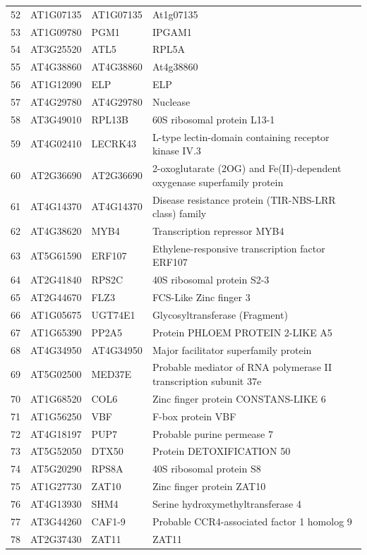 \documentclass[11pt]{article}
\begin{document}
\begin{center}
\begin{tabular}{rlll}
52 & AT1G07135 & AT1G07135 & At1g07135\\
53 & AT1G09780 & PGM1 & IPGAM1\\
54 & AT3G25520 & ATL5 & RPL5A\\
55 & AT4G38860 & AT4G38860 & At4g38860\\
56 & AT1G12090 & ELP & ELP\\
57 & AT4G29780 & AT4G29780 & Nuclease\\
58 & AT3G49010 & RPL13B & 60S ribosomal protein L13-1\\
59 & AT4G02410 & LECRK43 & L-type lectin-domain containing receptor kinase IV.3\\
60 & AT2G36690 & AT2G36690 & 2-oxoglutarate (2OG) and Fe(II)-dependent oxygenase superfamily protein\\
61 & AT4G14370 & AT4G14370 & Disease resistance protein (TIR-NBS-LRR class) family\\
62 & AT4G38620 & MYB4 & Transcription repressor MYB4\\
63 & AT5G61590 & ERF107 & Ethylene-responsive transcription factor ERF107\\
64 & AT2G41840 & RPS2C & 40S ribosomal protein S2-3\\
65 & AT2G44670 & FLZ3 & FCS-Like Zinc finger 3\\
66 & AT1G05675 & UGT74E1 & Glycosyltransferase (Fragment)\\
67 & AT1G65390 & PP2A5 & Protein PHLOEM PROTEIN 2-LIKE A5\\
68 & AT4G34950 & AT4G34950 & Major facilitator superfamily protein\\
69 & AT5G02500 & MED37E & Probable mediator of RNA polymerase II transcription subunit 37e\\
70 & AT1G68520 & COL6 & Zinc finger protein CONSTANS-LIKE 6\\
71 & AT1G56250 & VBF & F-box protein VBF\\
72 & AT4G18197 & PUP7 & Probable purine permease 7\\
73 & AT5G52050 & DTX50 & Protein DETOXIFICATION 50\\
74 & AT5G20290 & RPS8A & 40S ribosomal protein S8\\
75 & AT1G27730 & ZAT10 & Zinc finger protein ZAT10\\
76 & AT4G13930 & SHM4 & Serine hydroxymethyltransferase 4\\
77 & AT3G44260 & CAF1-9 & Probable CCR4-associated factor 1 homolog 9\\
78 & AT2G37430 & ZAT11 & ZAT11\\

\end{tabular}
\end{center}
\end{document}
